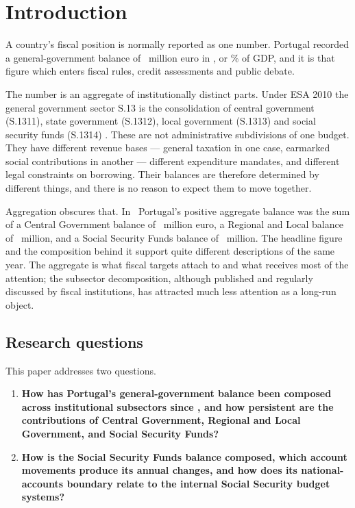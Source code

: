 
\section{Introduction}
\label{sec:introduction}

A country's fiscal position is normally reported as one number. Portugal recorded a
general-government balance of \LatestGg\ million euro in \LatestYear, or
\LatestGgPct\% of GDP, and it is that figure which enters fiscal rules, credit
assessments and public debate.

The number is an aggregate of institutionally distinct parts. Under ESA 2010 the
general government sector S.13 is the consolidation of central government
(S.1311), state government (S.1312), local government (S.1313) and social security
funds (S.1314) \citep{eurostat_esa2010}. These are not administrative
subdivisions of one budget. They have different revenue bases --- general taxation
in one case, earmarked social contributions in another --- different expenditure
mandates, and different legal constraints on borrowing. Their balances are
therefore determined by different things, and there is no reason to expect them to
move together.

Aggregation obscures that. In \LatestYear\ Portugal's positive aggregate balance was
the sum of a Central Government balance of \LatestCentral\ million euro, a Regional
and Local balance of \LatestRegional\ million, and a Social Security Funds balance
of \LatestSsf\ million. The headline figure and the composition behind it support
quite different descriptions of the same year. The aggregate is what fiscal targets
attach to and what receives most of the attention; the subsector decomposition,
although published and regularly discussed by fiscal institutions, has attracted
much less attention as a long-run object.

\subsection{Research questions}

This paper addresses two questions.

\begin{enumerate}
\item \textbf{How has Portugal's general-government balance been composed across
institutional subsectors since \PanelStart, and how persistent are the
contributions of Central Government, Regional and Local Government, and Social
Security Funds?}
\item \textbf{How is the Social Security Funds balance composed, which account
movements produce its annual changes, and how does its national-accounts boundary
relate to the internal Social Security budget systems?}
\end{enumerate}

